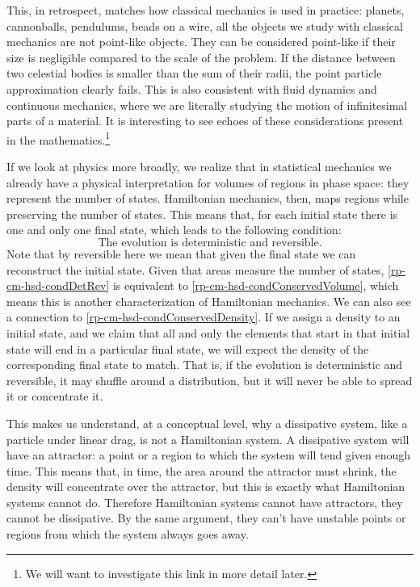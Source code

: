 This, in retrospect, matches how classical mechanics is used in practice: planets, cannonballs, pendulums, beads on a wire, all the objects we study with classical mechanics are not point-like objects. They can be considered point-like if their size is negligible compared to the scale of the problem. If the distance between two celestial bodies is smaller than the sum of their radii, the point particle approximation clearly fails. This is also consistent with fluid dynamics and continuous mechanics, where we are literally studying the motion of infinitesimal parts of a material. It is interesting to see echoes of these considerations present in the mathematics.\footnote{We will want to investigate this link in more detail later.}

If we look at physics more broadly, we realize that in statistical mechanics we already have a physical interpretation for volumes of regions in phase space: they represent the number of states. Hamiltonian mechanics, then, maps regions while preserving the number of states. This means that, for each initial state there is one and only one final state, which leads to the following condition:
\begin{equation}\label{rp-cm-hsd-condDetRev}
	\tag{HM-9}
	\text{The evolution is deterministic and reversible.}	
\end{equation}
Note that by reversible here we mean that given the final state we can reconstruct the initial state. Given that areas measure the number of states, \ref{rp-cm-hsd-condDetRev} is equivalent to \ref{rp-cm-hsd-condConservedVolume}, which means this is another characterization of Hamiltonian mechanics. We can also see a connection to \ref{rp-cm-hsd-condConservedDensity}. If we assign a density to an initial state, and we claim that all and only the elements that start in that initial state will end in a particular final state, we will expect the density of the corresponding final state to match. That is, if the evolution is deterministic and reversible, it may shuffle around a distribution, but it will never be able to spread it or concentrate it.

This makes us understand, at a conceptual level, why a dissipative system, like a particle under linear drag, is not a Hamiltonian system. A dissipative system will have an attractor: a point or a region to which the system will tend given enough time. This means that, in time, the area around the attractor must shrink, the density will concentrate over the attractor, but this is exactly what Hamiltonian systems cannot do. Therefore Hamiltonian systems cannot have attractors, they cannot be dissipative. By the same argument, they can't have unstable points or regions from which the system always goes away.

